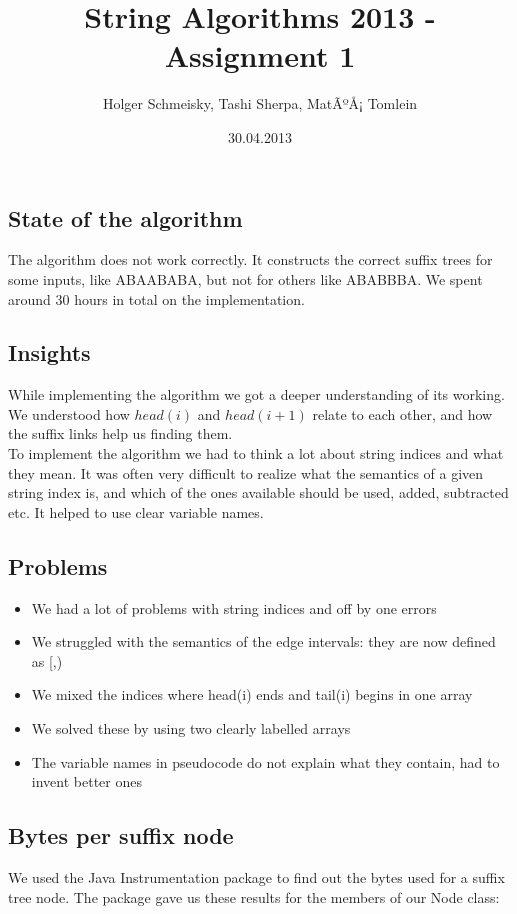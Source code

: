 \documentclass[a4paper,10pt]{article}
\title{String Algorithms 2013 - Assignment 1}
\author{Holger Schmeisky, Tashi Sherpa, MatÃºÅ¡ Tomlein}
\date{30.04.2013}
\begin{document}
\maketitle

\subsection*{State of the algorithm}
The algorithm does not work correctly. It constructs the correct suffix trees for some inputs, like ABAABABA, but not for others like ABABBBA. We spent around 30 hours in total on the implementation.

\subsection*{Insights}
While implementing the algorithm we got a deeper understanding of its working. We understood how $head(i)$ and $head(i+1)$ relate to each other, and how the suffix links help us finding them.\\
To implement the algorithm we had to think a lot about string indices and what they mean. It was often very difficult to realize what the semantics of a given string index is, and which of the ones available should be used, added, subtracted etc. It helped to use clear variable names.

\subsection*{Problems}
\begin{itemize}
  \item We had a lot of problems with string indices and off by one errors
  \item We struggled with the semantics of the edge intervals: they are now defined as [,)
  \item We mixed the indices where head(i) ends and tail(i) begins in one array
  \item We solved these by using two clearly labelled arrays
  \item The variable names in pseudocode do not explain what they contain, had to invent better ones
\end{itemize}

\subsection*{Bytes per suffix node}

We used the Java Instrumentation package to find out the bytes used for a suffix tree node.
The package gave us these results for the members of our Node class:
\end{document}
